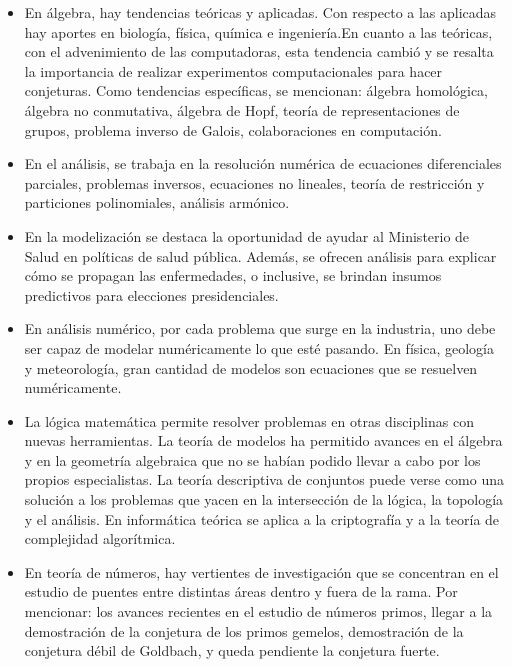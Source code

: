 \begin{itemize}
    
    \color{blue} \item \color{black}En álgebra, hay tendencias teóricas y aplicadas. Con respecto a las aplicadas hay aportes en biología, física, química e ingeniería.En cuanto a las teóricas, con el advenimiento de las computadoras, esta tendencia cambió y se resalta la importancia de realizar experimentos computacionales para hacer conjeturas. Como tendencias específicas, se mencionan: álgebra homológica, álgebra no conmutativa, álgebra de Hopf, teoría de representaciones de grupos, problema inverso de Galois, colaboraciones en computación. 

    
     \color{blue} \item \color{black} En el análisis, se trabaja en la resolución numérica de ecuaciones diferenciales parciales, problemas inversos, ecuaciones no lineales, teoría de restricción y particiones polinomiales, análisis armónico. 
     
    \color{blue} \item \color{black}  En la modelización se destaca la oportunidad de ayudar al Ministerio de Salud en políticas de salud pública. Además, se ofrecen análisis para explicar cómo se propagan las enfermedades, o inclusive, se brindan insumos predictivos para elecciones presidenciales. 
    
     \color{blue} \item \color{black} En análisis numérico, por cada problema que surge en la industria, uno debe ser capaz de modelar numéricamente lo que esté pasando. En física, geología y meteorología, gran cantidad de modelos son ecuaciones que se resuelven numéricamente. 
     
     \color{blue} \item \color{black} La lógica matemática permite resolver problemas en otras disciplinas con nuevas herramientas. La teoría de modelos ha permitido avances en el álgebra y en la geometría algebraica que no se habían podido llevar a cabo por los propios especialistas. La teoría descriptiva de conjuntos puede verse como una solución a los problemas que yacen en la intersección de la lógica, la topología y el análisis. En informática teórica se aplica a la criptografía y a la teoría de complejidad algorítmica.
     
     \color{blue} \item \color{black} En teoría de números, hay vertientes de investigación que se concentran en el estudio de puentes entre distintas áreas dentro y fuera de la rama. Por mencionar: los avances recientes en el estudio de números primos, llegar a la demostración de la conjetura de los primos gemelos, demostración de la conjetura débil de Goldbach, y queda pendiente la conjetura fuerte.  
     

\end{itemize}

